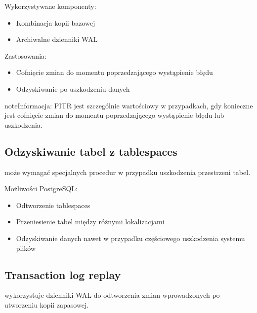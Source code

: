 \documentclass[a4paper,11pt,polish]{sphinxmanual}
\begin{document}
\sphinxAtStartPar
Wykorzystywane komponenty:
\begin{itemize}
\item {} 
\sphinxAtStartPar
Kombinacja kopii bazowej

\item {} 
\sphinxAtStartPar
Archiwalne dzienniki WAL

\end{itemize}

\sphinxAtStartPar
Zastosowania:
\begin{itemize}
\item {} 
\sphinxAtStartPar
Cofnięcie zmian do momentu poprzedzającego wystąpienie błędu

\item {} 
\sphinxAtStartPar
Odzyskiwanie po uszkodzeniu danych

\end{itemize}

\begin{sphinxadmonition}{note}{Informacja:}
\sphinxAtStartPar
PITR jest szczególnie wartościowy w przypadkach, gdy konieczne jest cofnięcie zmian do momentu poprzedzającego wystąpienie błędu lub uszkodzenia.
\end{sphinxadmonition}


\subsection{Odzyskiwanie tabel z tablespaces}
\label{\detokenize{Kopie_zapasowe_i_odzyskiwanie_danych/kopie_zapasowe_i_odzyskiwanie_danych:odzyskiwanie-tabel-z-tablespaces}}
\sphinxAtStartPar
{} może wymagać specjalnych procedur w przypadku uszkodzenia przestrzeni tabel.

\sphinxAtStartPar
Możliwości PostgreSQL:
\begin{itemize}
\item {} 
\sphinxAtStartPar
Odtworzenie tablespaces

\item {} 
\sphinxAtStartPar
Przeniesienie tabel między różnymi lokalizacjami

\item {} 
\sphinxAtStartPar
Odzyskiwanie danych nawet w przypadku częściowego uszkodzenia systemu plików

\end{itemize}


\subsection{Transaction log replay}
\label{\detokenize{Kopie_zapasowe_i_odzyskiwanie_danych/kopie_zapasowe_i_odzyskiwanie_danych:transaction-log-replay}}
\sphinxAtStartPar
{} wykorzystuje dzienniki WAL do odtworzenia zmian wprowadzonych po utworzeniu kopii zapasowej.
\end{document}
